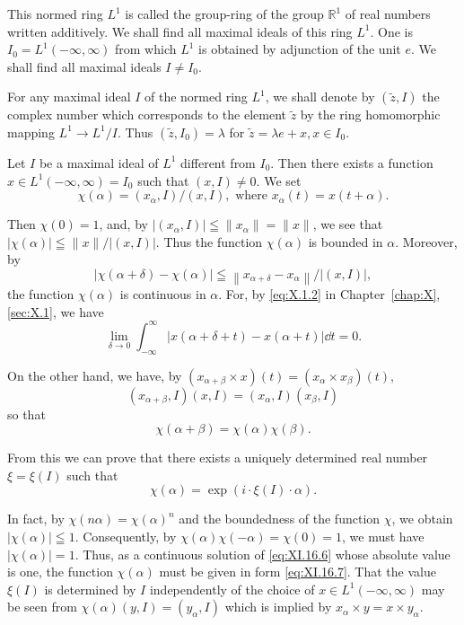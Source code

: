 This normed ring $L^{1}$ is called the group-ring of the group $\mathbb{R}^{1}$ of real numbers written additively. We shall find all maximal ideals of this ring $L^{1}$. One is $I_{0}=L^{1}(-\infty,\infty)$ from which $L^{1}$ is obtained by adjunction of the unit $e$. We shall find all maximal ideals $I\neq I_{0}$. 

For any maximal ideal $I$ of the normed ring $L^1$, we shall denote by $(\tilde{z}, I)$ the complex number which corresponds to the element $\tilde{z}$ by the ring homomorphic mapping $L^1 \to L^1 / I$. Thus $(\tilde{z}, I_0) = \lambda$ for $\tilde{z} = \lambda e + x, x \in I_0$. 

Let $I$ be a maximal ideal of $L^1$ different from $I_0$. Then there exists a function $x \in L^1(-\infty, \infty) = I_0$ such that $(x, I) \neq 0$. We set 
\begin{equation}\label{eq:XI.16.5}
\chi (\alpha) = (x _{\alpha}, I) / (x, I), \text{ where } x _{\alpha} (t) = x (t + \alpha).
\end{equation}

Then $\chi(0) = 1$, and, by $|(x_{\alpha}, I)| \leqq \|x_{\alpha}\| = \|x\|$, we see that $|\chi(\alpha)| \leqq \|x\| / |(x, I)|$. Thus the function $\chi(\alpha)$ is bounded in $\alpha$. Moreover, by 
\[
\left| \chi (\alpha + \delta) - \chi (\alpha) \right| \leqq \left\| x _{\alpha + \delta} - x _{\alpha} \right\| / |(x, I)|,
\]
the function $\chi (\alpha)$ is continuous in $\alpha$. For, by \eqref{eq:X.1.2} in Chapter~\ref{chap:X}, \ref{sec:X.1}, we have 
\[
\lim\limits _{\delta \rightarrow 0} \int_{- \infty} ^{\infty} | x (\alpha + \delta + t) - x (\alpha + t) | \dd t = 0.
\]

On the other hand, we have, by $(x_{\alpha + \beta} \times x)(t) = (x_{\alpha} \times x_{\beta})(t)$, 
\[
\left(x _{\alpha + \beta}, I\right) (x, I) = \left(x _{\alpha}, I\right) \left(x _{\beta}, I\right)
\]
so that 
\begin{equation}\label{eq:XI.16.6}
\chi (\alpha + \beta) = \chi (\alpha) \chi (\beta).
\end{equation}

From this we can prove that there exists a uniquely determined real number $\xi = \xi(I)$ such that 
\begin{equation}\label{eq:XI.16.7}
\chi (\alpha) = \exp (i \cdot \xi (I) \cdot \alpha).
\end{equation}

In fact, by $\chi(n\alpha) = \chi(\alpha)^n$ and the boundedness of the function $\chi$, we obtain $|\chi(\alpha)| \leqq 1$. Consequently, by $\chi(\alpha) \chi(-\alpha) = \chi(0) = 1$, we must have $|\chi(\alpha)| = 1$. Thus, as a continuous solution of \eqref{eq:XI.16.6} whose absolute value is one, the function $\chi(\alpha)$ must be given in form \eqref{eq:XI.16.7}. That the value $\xi(I)$ is determined by $I$ independently of the choice of $x \in L^1(-\infty, \infty)$ may be seen from $\chi(\alpha)(y, I) = (y_\alpha, I)$ which is implied by $x_\alpha \times y = x \times y_\alpha$. 

